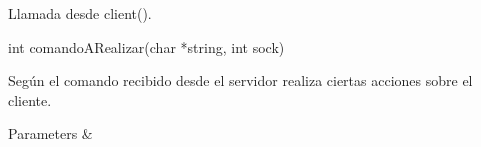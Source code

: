 Llamada desde client().


\begin{DoxyCode}
\textcolor{keywordtype}{int} comandoARealizar(\textcolor{keywordtype}{char} *\textcolor{keywordtype}{string}, \textcolor{keywordtype}{int} sock)
\end{DoxyCode}


Según el comando recibido desde el servidor realiza ciertas acciones sobre el cliente.


\begin{DoxyParams}{Parameters}
{\em } & \\
\hline
\end{DoxyParams}
